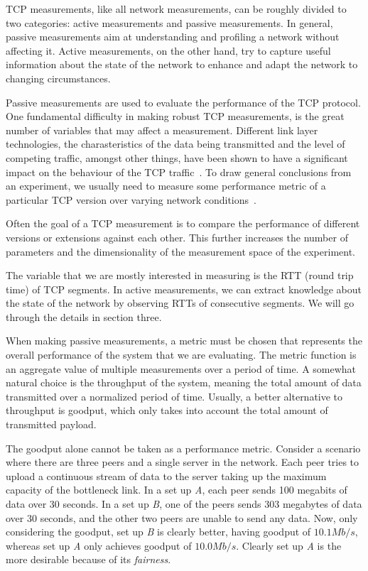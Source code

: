 TCP measurements, like all network measurements, can be roughly divided to two categories: active measurements and passive measurements. In general, passive measurements aim at understanding and profiling a network without affecting it. Active measurements, on the other hand, try to capture useful information about the state of the network to enhance and adapt the network to changing circumstances.   

Passive measurements are used to evaluate the performance of the TCP protocol. One fundamental difficulty in making robust TCP measurements, is the great number of variables that may affect a measurement. Different link layer technologies, the charasteristics of the data being transmitted and the level of competing traffic, amongst other things, have been shown to have a significant impact on the behaviour of the TCP traffic~\cite{Allman99}. To draw general conclusions from an experiment, we usually need to measure some performance metric of a particular TCP version over varying network conditions~\cite{Allman99}.  

Often the goal of a TCP measurement is to compare the performance of different versions or extensions against each other. This further increases the number of parameters and the dimensionality of the measurement space of the experiment.

The variable that we are mostly interested in measuring is the RTT (round trip time) of TCP segments. In active measurements, we can extract knowledge about the state of the network by observing RTTs of consecutive segments. We will go through the details in section three. 

When making passive measurements, a metric must be chosen that represents the overall performance of the system that we are evaluating. The metric function is an aggregate value of multiple measurements over a period of time. A somewhat natural choice is the throughput of the system, meaning the total amount of data transmitted over a normalized period of time. Usually, a better alternative to throughput is goodput, which only takes into account the total amount of transmitted payload.  

The goodput alone cannot be taken as a performance metric. Consider a scenario where there are three peers and a single server in the network. Each peer tries to upload a continuous stream of data to the server taking up the maximum capacity of the bottleneck link. In a set up \textit{A}, each peer sends 100 megabits of data over 30 seconds. In a set up \textit{B}, one of the peers sends 303 megabytes of data over 30 seconds, and the other two peers are unable to send any data. Now, only considering the goodput, set up \textit{B} is clearly better, having goodput of $10.1Mb/s$, whereas set up \textit{A} only achieves goodput of $10.0Mb/s$. Clearly set up \textit{A} is the more desirable because of its \textit{fairness}.

